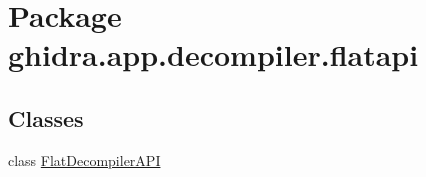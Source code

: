 \hypertarget{namespaceghidra_1_1app_1_1decompiler_1_1flatapi}{}\section{Package ghidra.\+app.\+decompiler.\+flatapi}
\label{namespaceghidra_1_1app_1_1decompiler_1_1flatapi}
\subsection*{Classes}
\begin{DoxyCompactItemize}
\item 
class \mbox{\hyperlink{classghidra_1_1app_1_1decompiler_1_1flatapi_1_1_flat_decompiler_a_p_i}{Flat\+Decompiler\+A\+PI}}
\end{DoxyCompactItemize}
